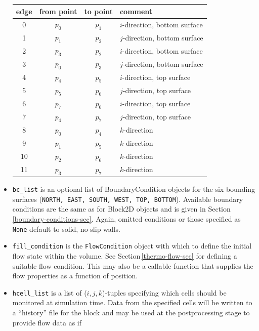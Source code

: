 \begin{itemize}
\begin{table}
\begin{center}
\begin{tabular}{cccl}
      \hline\hline
      edge & from point & to point & comment \\ 
      \hline
      0  & $p_0$      & $p_1$    & $i$-direction, bottom surface \\
      1  & $p_1$      & $p_2$    & $j$-direction, bottom surface \\
      2  & $p_3$      & $p_2$    & $i$-direction, bottom surface \\
      3  & $p_0$      & $p_3$    & $j$-direction, bottom surface \\
      4  & $p_4$      & $p_5$    & $i$-direction, top surface \\
      5  & $p_5$      & $p_6$    & $j$-direction, top surface \\
      6  & $p_7$      & $p_6$    & $i$-direction, top surface \\
      7  & $p_4$      & $p_7$    & $j$-direction, top surface \\
      8  & $p_0$      & $p_4$    & $k$-direction \\
      9  & $p_1$      & $p_5$    & $k$-direction \\
      10 & $p_2$      & $p_6$    & $k$-direction \\
      11 & $p_3$      & $p_7$    & $k$-direction \\
      \hline \hline
    \end{tabular}
  \end{center}
\end{table}
\item \texttt{bc\_list} is an optional list of BoundaryCondition objects for the 
  six bounding surfaces (\texttt{NORTH, EAST, SOUTH, WEST, TOP, BOTTOM}).
  Available boundary conditions are the same as for Block2D objects and is given
  in Section\,\ref{boundary-conditions-sec}.
  Again, omitted conditions or those specified as \texttt{None} default to
  solid, no-slip walls.
\item \texttt{fill\_condition} is the \texttt{FlowCondition} object with which to
  define the initial flow state within the volume.
  See Section\,\ref{thermo-flow-sec} for defining a suitable flow condition.
  This may also be a callable function that supplies the flow properties as
  a function of position.
\item \texttt{hcell\_list} is a list of ($i,j,k$)-tuples specifying which
  cells should be monitored at simulation time.
  Data from the specified cells will be written to a ``history'' file for the
  block and may be used at the postprocessing stage to provide flow data as if

\end{itemize}
